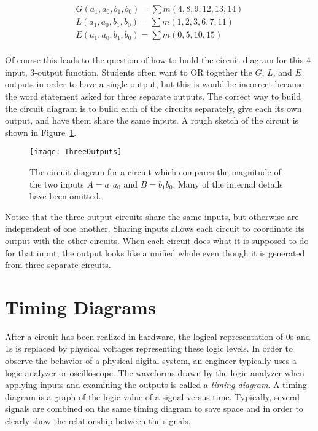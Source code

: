 $$
\begin{array}{l}
G(a_1,a_0,b_1,b_0)=\sum m(4,8,9,12,13,14)    \\
L(a_1,a_0,b_1,b_0)=\sum m(1,2,3,6,7,11)    \\
E(a_1,a_0,b_1,b_0)=\sum m(0,5,10,15)    \\
\end{array}$$

Of course this leads to the question of how to build the circuit
diagram for this 4-input, 3-output function.  Students often
want to OR together the $G$, $L$, and $E$ outputs in order to have
a single output, but this is would be incorrect because the word
statement asked for three separate outputs.  The correct way to build
the circuit diagram is to build each of the circuits separately, give
each its own output, and have them share the same inputs.  A rough
sketch of the circuit is shown in Figure~\ref{fig:representationsThreeOutputs}.

\begin{figure}[ht]
\texttt{[image: ThreeOutputs]}
\caption{The circuit diagram for a circuit which compares the
magnitude of the two inputs $A=a_1 a_0$ and $B=b_1 b_0$.  Many of
the internal details have been omitted.}
\label{fig:representationsThreeOutputs}
\end{figure}

Notice that the three output circuits share the same inputs, but otherwise
are independent of one another.  Sharing inputs allows each
circuit to coordinate its output with the other circuits.  When
each circuit does what it is supposed to do for that input, the
output looks like a unified whole even though it is generated from
three separate circuits.

\section{Timing Diagrams}
After a circuit has been realized in hardware, the logical
representation of 0s and 1s is replaced by physical voltages
representing these logic levels.  In order to observe the behavior
of a physical digital system, an engineer typically uses a
logic analyzer or oscilloscope.  The waveforms drawn by the logic
analyzer when applying inputs and examining the outputs is called
a \textit{timing diagram}.  A timing diagram is a graph of the logic value
of a signal versus time.  Typically, several signals are combined on the
same timing diagram to save space and in order to clearly
show the relationship between the signals.

